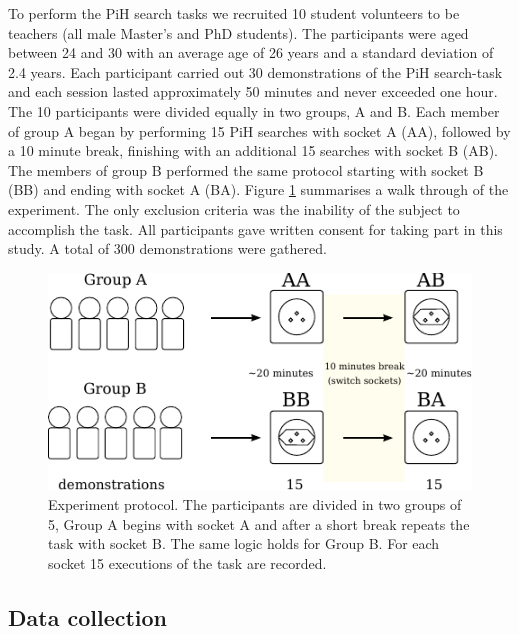 \documentclass[final,5p,times,twocolumn]{elsarticle}
\begin{document}
To perform the PiH search tasks we recruited 10 student volunteers to be teachers (all male Master's and PhD students).
The participants were aged between 24 and 30 with an average age of 26 years and a standard deviation of 2.4 years.
Each participant carried out 30 demonstrations of the PiH search-task and each session lasted approximately 50 minutes and 
never exceeded one hour. The 10 participants were divided equally in two groups, A and B. Each member of group A began 
by performing 15 PiH searches with socket A (AA), followed by a 10 minute break, finishing with an additional 15 searches with socket B (AB). 
The members of group B performed the same protocol starting with socket B (BB) and ending with socket A (BA).
Figure \ref{fig:experiment_design} summarises a walk through of the experiment.
The only exclusion criteria was the inability of the subject to accomplish the task. All participants gave written consent 
for taking part in this study. A total of 300 demonstrations were gathered.

\begin{figure}
\centering
 \includegraphics[width=0.9\linewidth]{./Figures/Fig/experiment_design_v2.pdf}
 \caption{Experiment protocol. The participants are divided in two groups of 5, Group A begins with socket A 
 and after a short break repeats the task with socket B. The same logic holds for Group B.
 For each socket 15 executions of the task are recorded.}
 \label{fig:experiment_design}
\end{figure}

\subsection{Data collection}
\end{document}
